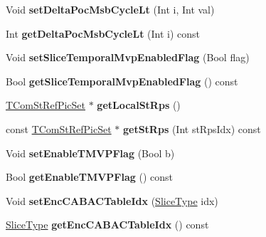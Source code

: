 \begin{DoxyCompactItemize}
Void {\bfseries set\+Delta\+Poc\+Msb\+Cycle\+Lt} (Int i, Int val)
\item 
\mbox{\label{class_t_com_slice_a21add868245e32c47ddc37dad916c760}} 
Int {\bfseries get\+Delta\+Poc\+Msb\+Cycle\+Lt} (Int i) const
\item 
\mbox{\label{class_t_com_slice_a4f3bd0e41ee00aa13e431f5c41513d56}} 
Void {\bfseries set\+Slice\+Temporal\+Mvp\+Enabled\+Flag} (Bool flag)
\item 
\mbox{\label{class_t_com_slice_adfb066fe7092db8221f98427d03d33a5}} 
Bool {\bfseries get\+Slice\+Temporal\+Mvp\+Enabled\+Flag} () const
\item 
\mbox{\label{class_t_com_slice_a2cd48574f3b9889e10b6c00b5f3f1105}} 
\hyperlink{class_t_com_st_ref_pic_set}{T\+Com\+St\+Ref\+Pic\+Set} $\ast$ {\bfseries get\+Local\+St\+Rps} ()
\item 
\mbox{\label{class_t_com_slice_a22856d1ca7de3af19ae5ec97afb5025e}} 
const \hyperlink{class_t_com_st_ref_pic_set}{T\+Com\+St\+Ref\+Pic\+Set} $\ast$ {\bfseries get\+St\+Rps} (Int st\+Rps\+Idx) const
\item 
\mbox{\label{class_t_com_slice_a780664a5b0fa24b1225a436ab2445096}} 
Void {\bfseries set\+Enable\+T\+M\+V\+P\+Flag} (Bool b)
\item 
\mbox{\label{class_t_com_slice_ada05b53c1a26e342dcb1c0c415eb0bfb}} 
Bool {\bfseries get\+Enable\+T\+M\+V\+P\+Flag} () const
\item 
\mbox{\label{class_t_com_slice_a9a921133249ec0b59a0424052f10fbc3}} 
Void {\bfseries set\+Enc\+C\+A\+B\+A\+C\+Table\+Idx} (\hyperlink{_type_def_8h_a8fc5fd31653a387f7430d29863620f71}{Slice\+Type} idx)
\item 
\mbox{\label{class_t_com_slice_aaf413a9ca7e9f896fa91df77cc21c5e5}} 
\hyperlink{_type_def_8h_a8fc5fd31653a387f7430d29863620f71}{Slice\+Type} {\bfseries get\+Enc\+C\+A\+B\+A\+C\+Table\+Idx} () const
\item 
\mbox{\label{class_t_com_slice_a09afe04011561337f32412ac9e75cdc3}} 

\end{DoxyCompactItemize}
